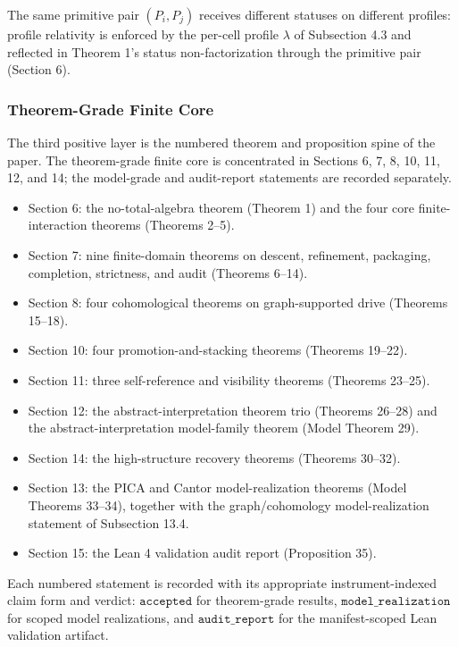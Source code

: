 \documentclass[11pt]{article}
\providecommand{\tightlist}{}
\theoremstyle{definition}
\begin{document}
The same primitive pair \((P_{i},P_{j})\) receives different statuses on different profiles: profile relativity is enforced by the per-cell profile \(\lambda\) of Subsection 4.3 and reflected in Theorem 1's status non-factorization through the primitive pair (Section 6).

\subsubsection{Theorem-Grade Finite Core}

The third positive layer is the numbered theorem and proposition spine of the paper. The theorem-grade finite core is concentrated in Sections 6, 7, 8, 10, 11, 12, and 14; the model-grade and audit-report statements are recorded separately.

\begin{itemize}
\tightlist
\item
  Section 6: the no-total-algebra theorem (Theorem 1) and the four core finite-interaction theorems (Theorems 2--5).
\item
  Section 7: nine finite-domain theorems on descent, refinement, packaging, completion, strictness, and audit (Theorems 6--14).
\item
  Section 8: four cohomological theorems on graph-supported drive (Theorems 15--18).
\item
  Section 10: four promotion-and-stacking theorems (Theorems 19--22).
\item
  Section 11: three self-reference and visibility theorems (Theorems 23--25).
\item
  Section 12: the abstract-interpretation theorem trio (Theorems 26--28) and the abstract-interpretation model-family theorem (Model Theorem 29).
\item
  Section 14: the high-structure recovery theorems (Theorems 30--32).
\item
  Section 13: the PICA and Cantor model-realization theorems (Model Theorems 33--34), together with the graph/cohomology model-realization statement of Subsection 13.4.
\item
  Section 15: the Lean 4 validation audit report (Proposition 35).
\end{itemize}

Each numbered statement is recorded with its appropriate instrument-indexed claim form and verdict: \(\texttt{accepted}\) for theorem-grade results, \(\texttt{model\_realization}\) for scoped model realizations, and \(\texttt{audit\_report}\) for the manifest-scoped Lean validation artifact.
\end{document}
